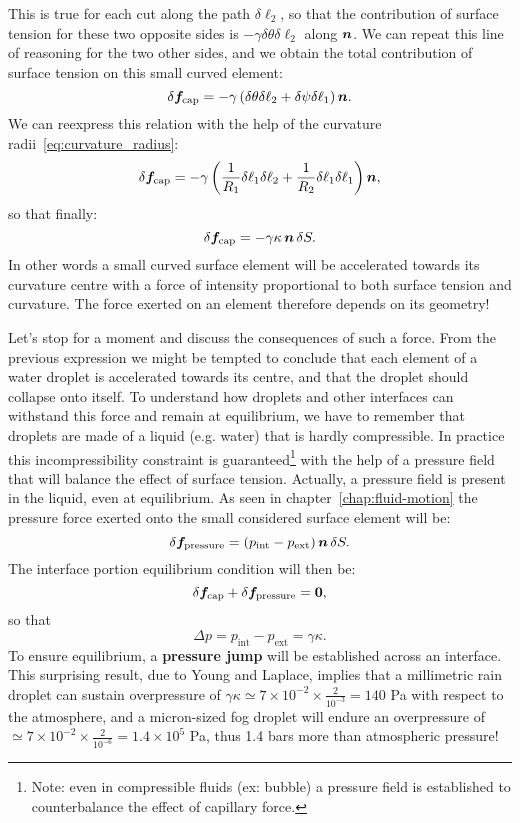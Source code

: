 This is true for each cut along the path $\delta \ell_2$, so that the contribution of surface tension for these two opposite sides is $ -\gamma \delta \theta \delta \ell_2$ along $\bn$. We can repeat this line of reasoning for the two other sides, and we obtain the total contribution of surface tension on this small curved element:
\begin{equation}
\delta \boldsymbol f_\text{cap} = - \gamma \lp \delta \theta \delta \ell_2 + \delta \psi \delta \ell_1 \rp \bn.
\end{equation}
We can reexpress this relation with the help of the curvature radii~\eqref{eq:curvature_radius}:
\begin{equation}
\delta \boldsymbol f_\text{cap} = - \gamma \lp \frac{1}{R_1}\delta \ell_1 \delta \ell_2 + \frac{1}{R_2}\delta \ell_1 \delta \ell_1 \rp \bn,
\end{equation}
so that finally:
\begin{equation}
\delta \boldsymbol f_\text{cap} = - \gamma \kappa \, \bn \, \delta S.
\end{equation}
In other words a small curved surface element will be accelerated towards its curvature centre with a force of intensity proportional to both surface tension and curvature. The force exerted on an element therefore depends on its geometry!

Let's stop for a moment and discuss the consequences of such a force. From the previous expression we might be tempted to conclude that each element of a water droplet is accelerated towards its centre, and that the droplet should collapse onto itself. To understand how droplets and other interfaces can withstand this force and remain at equilibrium, we have to remember that droplets are made of a liquid (e.g. water) that is hardly compressible. In practice this incompressibility constraint is guaranteed\footnote{Note: even in compressible fluids (ex: bubble) a pressure field is established to counterbalance the effect of capillary force.} with the help of a pressure field that will balance the effect of surface tension. Actually, a pressure field is present in the liquid, even at equilibrium. As seen in chapter~\ref{chap:fluid-motion} the pressure force exerted onto the small considered surface element will be: 
$$
\delta \bff_\text{pressure} = \lp p_\text{int} - p_\text{ext}\rp \bn \,\delta S.
$$
The interface portion equilibrium condition will then be:
\begin{equation}
\delta \bff_\text{cap} + \delta \bff_\text{pressure}  = \boldsymbol 0,
\end{equation}
so that
\begin{equation}
\Delta p = p_\text{int} - p_\text{ext} = \gamma \kappa.
\label{eq:laplace_jump}
\end{equation}
To ensure equilibrium, a \textbf{pressure jump} will be established across an interface. This surprising result, due to Young and Laplace, implies that a millimetric rain droplet can sustain overpressure of $\gamma \kappa \simeq 7 \times 10^{-2} \times \frac{2}{10^{-3}} = 140 $ Pa with respect to the atmosphere, and a micron-sized fog droplet will endure an overpressure of $\simeq 7 \times 10^{-2} \times \frac{2}{10^{-6}} = 1.4\times 10^{5} $ Pa, thus 1.4 bars more than atmospheric pressure!
